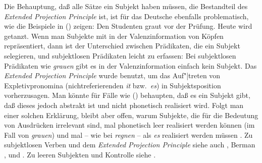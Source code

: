 Die Behauptung, daß alle Sätze ein Subjekt haben müssen, die Bestandteil des
\emph{Extended Projection Principle} ist,
ist für das Deutsche ebenfalls problematisch,
wie die Beispiele in () zeigen:
\eal
{}
\ex Den Studenten graut vor der Prüfung.
\ex Heute wird getanzt.
\zl
Wenn man Subjekte mit in der Valenzinformation von Köpfen repräsentiert, dann
ist der Unterschied zwischen Prädikaten, die ein Subjekt selegieren, und subjektlosen
Prädikaten leicht zu erfassen: Bei subjektlosen Prädikaten wie \emph{grauen}
gibt es in der Valenzinformation einfach kein Subjekt.
Das \emph{Extended Projection Principle} wurde benutzt, um das Auf"|treten von Expletivpronomina
(nichtreferierenden \emph{it} bzw.\ \emph{es}) in Subjektsposition vorherzusagen.
Man könnte für Fälle wie () behaupten, daß es ein Subjekt gibt, daß
dieses jedoch abstrakt ist und nicht phonetisch realisiert wird. Folgt
man einer solchen Erklärung, bleibt aber offen, warum Subjekte, die für
die Bedeutung von Ausdrücken irrelevant sind, mal phonetisch leer realisiert werden
können (im Fall von \emph{grauen}) und mal -- wie bei \emph{regnen} --
als \emph{es} realisiert werden müssen \citep[]{Fanselow91a}. 
Zu subjektlosen Verben und dem
\emph{Extended Projection Principle} siehe auch , 
Berman \citeyear{Berman99a}, \citeyear[Kapitel~4]{Berman2003a} und .
Zu leeren Subjekten und Kontrolle siehe .



